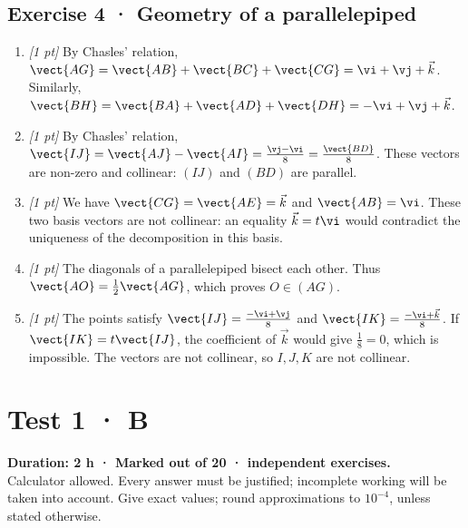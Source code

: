 \subsection*{Exercise 4 · Geometry of a parallelepiped}\begin{enumerate}

\item \textit{[1 pt]} By Chasles' relation, $\vect{AG}=\vect{AB}+\vect{BC}+\vect{CG}=\vi +\vj +\vec k$. Similarly, $\vect{BH}=\vect{BA}+\vect{AD}+\vect{DH}=-\vi +\vj +\vec k$.

\item \textit{[1 pt]} By Chasles' relation, $\vect{IJ}=\vect{AJ}-\vect{AI}=\frac{\vj -\vi }{8}=\frac{\vect{BD}}{8}$. These vectors are non-zero and collinear: $(IJ)$ and $(BD)$ are parallel.

\item \textit{[1 pt]} We have $\vect{CG}=\vect{AE}=\vec k$ and $\vect{AB}=\vi $. These two basis vectors are not collinear: an equality $\vec k=t\vi $ would contradict the uniqueness of the decomposition in this basis.

\item \textit{[1 pt]} The diagonals of a parallelepiped bisect each other. Thus $\vect{AO}=\frac12\vect{AG}$, which proves $O\in(AG)$.

\item \textit{[1 pt]} The points satisfy $\vect{IJ}=\frac{-\vi +\vj }{8}$ and $\vect{IK}=\frac{-\vi +\vec k}{8}$. If $\vect{IK}=t\vect{IJ}$, the coefficient of $\vec k$ would give $\frac{1}{8}=0$, which is impossible. The vectors are not collinear, so $I,J,K$ are not collinear.

\end{enumerate}

\fi

\fi

\ifmxteacher

\mxnewpage{}\label{sujet:1-4}

\section*{Test 1 · B}


\textbf{Duration: 2 h · Marked out of 20 ·  independent exercises.}\\Calculator allowed. Every answer must be justified; incomplete working will be taken into account. Give exact values; round approximations to $10^{-4}$, unless stated otherwise.

